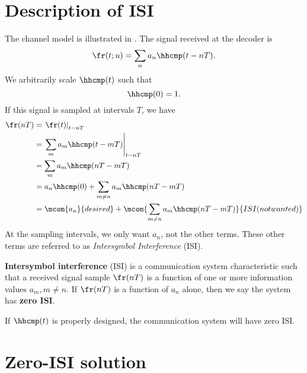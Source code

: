 \section{Description of ISI}
\label{sec:chan-model}
The channel model is illustrated in .
The signal received at the decoder is
\[ \fr(t;u) = \sum_n a_n \hhcmp(t-nT). \]
We arbitrarily scale $\hhcmp(t)$ such that
\[ \hhcmp(0)=1. \]
If this signal is sampled at intervals $T$, we have
\begin{align*}
  \fr(nT)
    &= \left.\fr(t)\right|_{t=nT}
  \\&= \left. \sum_m a_m \hhcmp(t-mT) \right|_{t=nT}
  \\&= \sum_m a_m \hhcmp(nT-mT)
  \\&= a_n \hhcmp(0) + \sum_{m\not=n} a_m \hhcmp(nT-mT)
  \\&= \mcom{a_n}{desired} + \mcom{\sum_{m\not=n} a_m \hhcmp(nT-mT)}{ISI (not wanted)}
\end{align*}
At the sampling intervals, we only want $a_n$, not the other terms.
These other terms are referred to as {\em Intersymbol Interference} (ISI).

\begin{definition}
{\bf Intersymbol interference} (ISI) is a communication system characteristic
such that
a received signal sample $\fr(nT)$ is a function
of one or more information values $a_m, m\ne n$.
If $\fr(nT)$ is a function of $a_n$ alone,
then we say the system has {\bf zero ISI}.
\end{definition}

If $\hhcmp(t)$ is properly designed,
the communication system will have zero ISI.


\section{Zero-ISI solution}
\label{sec:isi_zero}
